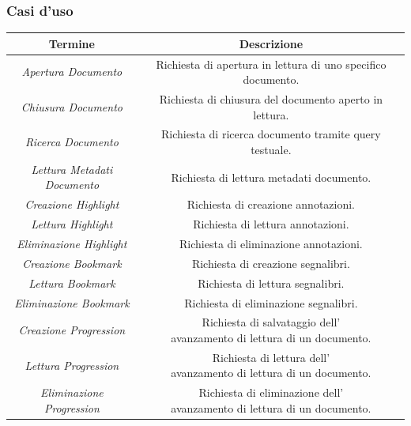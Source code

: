 \newpage
\subsubsection*{Casi d'uso}
\begin{table}[H]
\centering
    \begin{tabular}{|c|c|}
         \hline
         \textbf{Termine} & \textbf{Descrizione}\\
         \hline
         \textit{Apertura Documento} & \specialcell{Richiesta di apertura in lettura di uno specifico\\ documento.}\\
         \hline
         \textit{Chiusura Documento} & Richiesta di chiusura del documento aperto in lettura.\\
         \hline
         \textit{Ricerca Documento} & Richiesta di ricerca documento tramite query testuale.\\
         \hline
         \specialcell{\textit{Lettura Metadati}\\\textit{Documento}} & Richiesta di lettura metadati documento.\\
         \hline
         \textit{Creazione Highlight} & Richiesta di creazione annotazioni.\\
         \hline
         \textit{Lettura Highlight} & Richiesta di lettura annotazioni.\\
         \hline
         \textit{Eliminazione Highlight} & Richiesta di eliminazione annotazioni.\\
         \hline
         \textit{Creazione Bookmark} & Richiesta di creazione segnalibri.\\
         \hline
         \textit{Lettura Bookmark} & Richiesta di lettura segnalibri.\\
         \hline
         \textit{Eliminazione Bookmark} & Richiesta di eliminazione segnalibri.\\
         \hline
         \textit{Creazione Progression} & \specialcell{Richiesta di salvataggio dell'\\avanzamento di lettura di un documento.}\\
         \hline
         \textit{Lettura Progression} &  \specialcell{Richiesta di lettura dell'\\avanzamento di lettura di un documento.}\\
         \hline
         \textit{Eliminazione Progression} &  \specialcell{Richiesta di eliminazione dell'\\avanzamento di lettura di un documento.}\\

\end{tabular}
\end{table}
